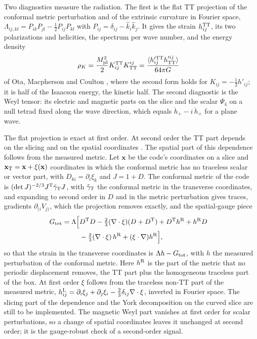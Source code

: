 \documentclass[aps,prd,twocolumn,10pt,superscriptaddress,nofootinbib,longbibliography,floatfix]{revtex4-2}
\newcommand{\TT}{\Lambda}
\begin{document}
Two diagnostics measure the radiation. The first is the flat TT projection of the conformal metric perturbation and of the extrinsic curvature in Fourier space, $\TT_{ij,kl}=P_{ik}P_{jl}-\tfrac12P_{ij}P_{kl}$ with $P_{ij}=\delta_{ij}-\hat k_i\hat k_j$. It gives the strain $h^{\rm TT}_{ij}$, its two polarizations and helicities, the spectrum per wave number, and the energy density
\begin{equation}\label{eq:rhoK}
\rho_K = \frac{M_{\rm pl}^2}{2}K^{\rm TT}_{ij}K_{\rm TT}^{ij} = \frac{\langle h'^{\rm TT}_{ij}h'^{ij}_{\rm TT}\rangle}{64\pi G}
\end{equation}
of Ota, Macpherson and Coulton \cite{Ota:2021tt}, where the second form holds for $K_{ij}=-\tfrac12 h'_{ij}$; it is half of the Isaacson energy, the kinetic half. The second diagnostic is the Weyl tensor: its electric and magnetic parts on the slice and the scalar $\Psi_4$ on a null tetrad fixed along the wave direction, which equals $\ddot h_+ - i\,\ddot h_\times$ for a plane wave.

The flat projection is exact at first order. At second order the TT part depends on the slicing and on the spatial coordinates \cite{Hwang:2017gauge}. The spatial part of this dependence follows from the measured metric. Let $\mathbf x$ be the code's coordinates on a slice and $\mathbf x_{\rm T}=\mathbf x+\xi(\mathbf x)$ coordinates in which the conformal metric has no traceless scalar or vector part, with $D_{ki}=\partial_i\xi_k$ and $J=1+D$. The conformal metric of the code is $(\det J)^{-2/3}J^{\rm T}\tilde\gamma_{\rm T}J$, with $\tilde\gamma_{\rm T}$ the conformal metric in the transverse coordinates, and expanding to second order in $D$ and in the metric perturbation gives traces, gradients $\partial_{(i}V_{j)}$, which the projection removes exactly, and the spatial-gauge piece
\begin{equation}\label{eq:gaugepiece}
\begin{split}
G_{\rm tot} = \TT\Big[&D^{\rm T}D - \tfrac23(\nabla\cdot\xi)(D+D^{\rm T}) + D^{\rm T}h^{\rm R} + h^{\rm R}D\\
&- \tfrac23(\nabla\cdot\xi)\,h^{\rm R} + (\xi\cdot\nabla)h^{\rm R}\Big],
\end{split}
\end{equation}
so that the strain in the transverse coordinates is $\TT h-G_{\rm tot}$, with $h$ the measured perturbation of the conformal metric. Here $h^{\rm R}$ is the part of the metric that no periodic displacement removes, the TT part plus the homogeneous traceless part of the box. At first order $\xi$ follows from the traceless non-TT part of the measured metric, $h^{\rm L}_{ij}=\partial_i\xi_j+\partial_j\xi_i-\tfrac23\delta_{ij}\nabla\cdot\xi$, inverted in Fourier space. The slicing part of the dependence and the York decomposition on the curved slice are still to be implemented. The magnetic Weyl part vanishes at first order for scalar perturbations, so a change of spatial coordinates leaves it unchanged at second order; it is the gauge-robust check of a second-order signal.
\end{document}
